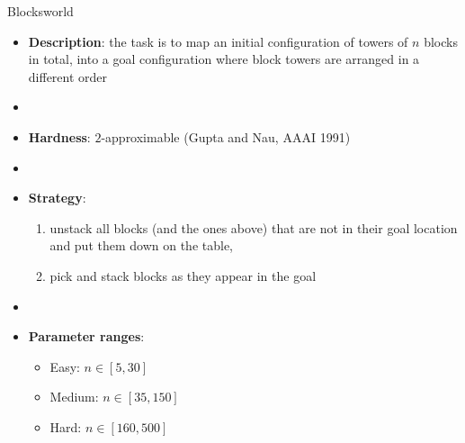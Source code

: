 \documentclass[aspectratio=169,xcolor=dvipsnames]{beamer}
\begin{document}
\begin{frame}{Blocksworld}

    \begin{itemize}
        \item \textbf{Description}: the task is to map an initial configuration of towers of $n$ blocks in total, into a goal configuration where block towers are arranged in a different order
        \item[]
        \item \textbf{Hardness}: $2$-approximable (Gupta and Nau, AAAI 1991)
        \item[] 
        \item \textbf{Strategy}: 
        \begin{enumerate}
            \item unstack all blocks (and the ones above) that are not in their goal location and put them down on the table,
            \item pick and stack blocks as they appear in the goal
        \end{enumerate}
        \item[]
        \item \textbf{Parameter ranges}:
        \begin{itemize}
            \item Easy: $n \in [5, 30]$
            \item Medium: $n \in [35, 150]$
            \item Hard: $n \in [160, 500]$
        \end{itemize}
    \end{itemize}

\end{frame}
\end{document}

